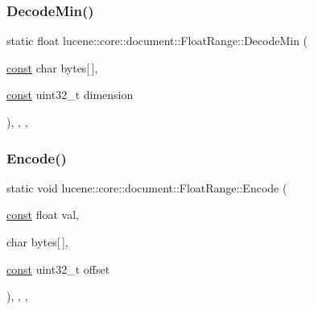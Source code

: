 \mbox{\label{classlucene_1_1core_1_1document_1_1FloatRange_a8b52adb68b6c046ed19a775223ff06bf}} 
\subsubsection{\texorpdfstring{Decode\+Min()}{DecodeMin()}}
{\footnotesize\ttfamily static float lucene\+::core\+::document\+::\+Float\+Range\+::\+Decode\+Min (\begin{DoxyParamCaption}\item[{\mbox{\hyperlink{ZlibCrc32_8h_a2c212835823e3c54a8ab6d95c652660e}{const}} char}]{bytes\mbox{[}$\,$\mbox{]},  }\item[{\mbox{\hyperlink{ZlibCrc32_8h_a2c212835823e3c54a8ab6d95c652660e}{const}} uint32\+\_\+t}]{dimension }\end{DoxyParamCaption})\hspace{0.3cm}{\ttfamily [inline]}, {\ttfamily [static]}, {\ttfamily [private]}, {\ttfamily [noexcept]}}

\mbox{\label{classlucene_1_1core_1_1document_1_1FloatRange_a7ae1d5511c0454db48cf70e7d872470e}} 
\subsubsection{\texorpdfstring{Encode()}{Encode()}}
{\footnotesize\ttfamily static void lucene\+::core\+::document\+::\+Float\+Range\+::\+Encode (\begin{DoxyParamCaption}\item[{\mbox{\hyperlink{ZlibCrc32_8h_a2c212835823e3c54a8ab6d95c652660e}{const}} float}]{val,  }\item[{char}]{bytes\mbox{[}$\,$\mbox{]},  }\item[{\mbox{\hyperlink{ZlibCrc32_8h_a2c212835823e3c54a8ab6d95c652660e}{const}} uint32\+\_\+t}]{offset }\end{DoxyParamCaption})\hspace{0.3cm}{\ttfamily [inline]}, {\ttfamily [static]}, {\ttfamily [private]}, {\ttfamily [noexcept]}}

